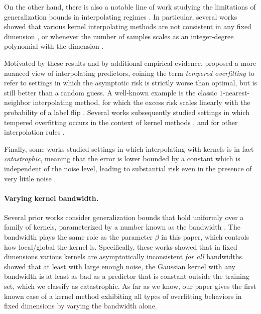 On the other hand, there is also a notable line of work studying the limitations of generalization bounds in interpolating regimes \citep{belkin2018understand,zhang2021understanding,nagarajan2019uniform}.
In particular, several works showed that various kernel interpolating methods are not consistent in any fixed dimension \citep{rakhlin2019consistency,beaglehole2023inconsistency,haas2024mind}, 
or whenever the number of samples scales
as an integer-degree polynomial with the dimension
\citep{mei2022generalization, xiao2022precise, barzilai2024generalization, zhang2024phase}.

Motivated by these results and by additional empirical evidence, \citet{mallinar2022benign} proposed a more nuanced view of interpolating predictors,
coining the term \emph{tempered overfitting} to refer to settings in which the asymptotic risk is strictly worse than optimal, but is still better than a random guess. 
A well-known example is the classic $1$-nearest-neighbor interpolating method, for which the excess risk scales linearly with the probability of a label flip \citep{cover1967nearest}.
Several works subsequently studied settings in which tempered overfitting occurs in the context of kernel methods
\citep{li2024asymptotic,barzilai2024generalization,cheng2024comprehensive},
and for other interpolation rules
\citep{manoj2023interpolation,kornowski2024tempered,harel2024provable}.

Finally, some works studied settings in which interpolating with kernels is in fact \emph{catastrophic},
meaning that the error is lower bounded by a constant which is independent of the noise level, leading to substantial risk even in the presence of very little noise \citep{kornowski2024tempered,joshi2024noisy,medvedev2024overfitting, cheng2024characterizing}.

\paragraph{Varying kernel bandwidth.}
Several prior works consider generalization bounds that hold uniformly over a family of kernels, parameterized by a number known as the bandwidth \citep{rakhlin2019consistency, buchholz2022kernel, beaglehole2023inconsistency, haas2024mind, medvedev2024overfitting}. The bandwidth plays the same role as the parameter $\beta$ in this paper, which controls how local/global the kernel is. Specifically, these works showed that in fixed dimensions various kernels are asymptotically inconsistent \emph{for all} bandwidths. \citet{medvedev2024overfitting} showed that at least with large enough noise, the Gaussian kernel with any bandwidth is at least as bad as a predictor that is constant outside the training set, which we classify as catastrophic. As far as we know, our paper gives the first known case of a kernel method exhibiting all types of overfitting behaviors in fixed dimensions by varying the bandwidth alone.